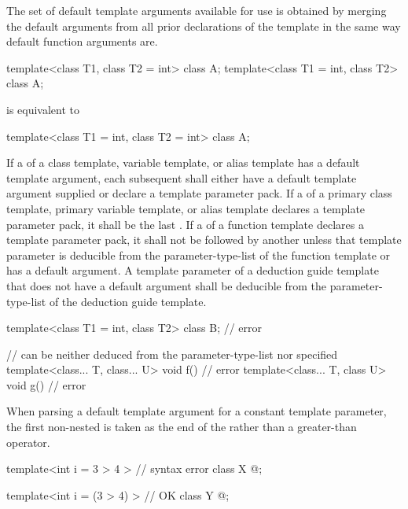 \pnum
The set of default template arguments
available for use is obtained by merging the default arguments
from all prior declarations of the template in the
same way default function arguments are.
\begin{example}
\begin{codeblock}
template<class T1, class T2 = int> class A;
template<class T1 = int, class T2> class A;
\end{codeblock}
is equivalent to
\begin{codeblock}
template<class T1 = int, class T2 = int> class A;
\end{codeblock}
\end{example}

\pnum
If a 
of a class template, variable template, or alias template has
a default template argument,
each subsequent 
shall either have a default template argument supplied or
declare a template parameter pack.
If a  of
a primary class template, primary variable template, or alias template
declares a template parameter pack,
it shall be the last .
If a  of a function template
declares a template parameter pack, it
shall not be followed by another 
unless that template parameter is deducible from the
parameter-type-list of the function template or
has a default argument.
A template parameter of a deduction guide template
that does not have a default argument shall be deducible
from the parameter-type-list of the deduction guide template.
\begin{example}
\begin{codeblock}
template<class T1 = int, class T2> class B;     // error

//  can be neither deduced from the parameter-type-list nor specified
template<class... T, class... U> void f() { }   // error
template<class... T, class U> void g() { }      // error
\end{codeblock}
\end{example}

%
\pnum
When parsing a default template argument
for a constant template parameter,
the first non-nested \tcode{>} is taken as
the end of the 
rather than a greater-than operator.
\begin{example}
\begin{codeblock}
template<int i = 3 > 4 >        // syntax error
class X { @\commentellip@ };

template<int i = (3 > 4) >      // OK
class Y { @\commentellip@ };
\end{codeblock}
\end{example}

